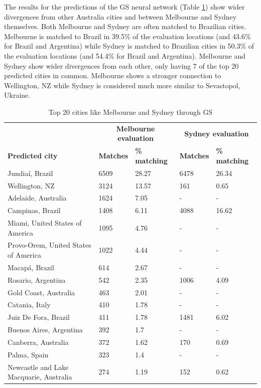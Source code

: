 \documentclass[sageh,times]{sagej}
\begin{document}
The results for the predictions of the GS neural network (Table \ref{tab:melbournesydneyGS}) show wider divergences from other Australia cities and between Melbourne and Sydney themselves. Both Melbourne and Sydney are often matched to Brazilian cities. Melbourne is matched to Brazil in 39.5\% of the evaluation locations (and 43.6\% for Brazil and Argentina) while Sydney is matched to Brazilian cities in 50.3\% of the evaluation locations (and 54.4\% for Brazil and Argentina). Melbourne and Sydney show wider divergences from each other, only having 7 of the top 20 predicted cities in common. Melbourne shows a stronger connection to Wellington, NZ while Sydney is considered much more similar to Sevastopol, Ukraine.

\begin{table}[!htbp]
\caption{Top 20 cities like Melbourne and Sydney through GS \label{tab:melbournesydneyGS}}     
\begin{tabular}{ l  l l l  l}
 \hline    &  \multicolumn{2}{c}{\textbf{Melbourne evaluation}} & \multicolumn{2}{c}{\textbf{Sydney evaluation}}  \\  
\textbf{Predicted city} & \textbf{Matches} & \textbf{\% matching}  & \textbf{Matches} & \textbf{\% matching}\\ \hline
Jundia\'{i}, Brazil & 6509 & 28.27 & 6478 & 26.34 \\ 
Wellington, NZ & 3124 & 13.57 & 161 & 0.65 \\ 
Adelaide, Australia & 1624 & 7.05 &-&- \\ 
Campinas, Brazil & 1408 & 6.11 & 4088 & 16.62 \\ 
Miami, United States of America & 1095 & 4.76 &-&- \\ 
Provo-Orem, United States of America & 1022 & 4.44 &-&- \\ 
Macap\'{a}, Brazil & 614 & 2.67 &-&- \\ 
Rosario, Argentina & 542 & 2.35 & 1006 & 4.09 \\ 
Gold Coast, Australia & 463 & 2.01 &-&- \\ 
Catania, Italy & 410 & 1.78 &-&- \\ 
Juiz De Fora, Brazil & 411 & 1.78 & 1481 & 6.02 \\ 
Buenos Aires, Argentina & 392 & 1.7 &-&- \\ 
Canberra, Australia & 372 & 1.62 & 170 & 0.69 \\ 
Palma, Spain & 323 & 1.4 &-&- \\ 
Newcastle and Lake Macquarie, Australia & 274 & 1.19 & 152 & 0.62 \\ 

\end{tabular}
\end{table}
\end{document}
